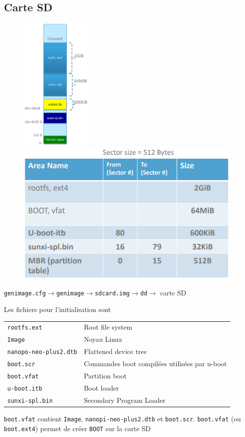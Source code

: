 \documentclass[resume]{subfiles}
\begin{document}
\subsection{Carte SD}
\begin{figure}[H]
\centering
\includegraphics[width=3.50cm]{img_2.png}\\
\includegraphics[width=0.75\columnwidth]{img_3.png}
\end{figure}
\begin{center}
\verb!genimage.cfg!$\longrightarrow$\verb!genimage!$\longrightarrow$\verb!sdcard.img!$\longrightarrow$\verb!dd!$\longrightarrow$ carte SD
\end{center}
Les fichiers pour l'initialisation sont\\
\begin{table}[H]
\begin{tabular}{ll}
\verb!rootfs.ext! & Root file system\\
\verb!Image! & Noyau Linux\\
\verb!nanopo-neo-plus2.dtb! & Flattened device tree\\
\verb!boot.scr! & Commandes boot compilées utilisées par u-boot\\
\verb!boot.vfat! & Partition boot\\
\verb!u-boot.itb! & Boot loader\\
\verb!sunxi-spl.bin! & Secondary Program Loader
\end{tabular}
\end{table}
\verb!boot.vfat! contient \verb!Image!, \verb!nanopi-neo-plus2.dtb! et \verb!boot.scr!. \verb!boot.vfat! (ou \verb!boot.ext4!) permet de créer \verb!BOOT! sur la carte SD
\end{document}
